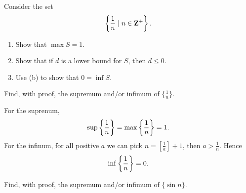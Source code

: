 \begin{exercise}
Consider the set
\[\left\{\frac{1}{n}\mid n\in\mathbf Z^{+}\right\}.\]
\begin{enumerate}[label=(\alph*)]
\item Show that $\max S=1$.
\item Show that if $d$ is a lower bound for $S$, then $d \le 0$.
\item Use (b) to show that $0 = \inf S$.
\end{enumerate}
\end{exercise}

\begin{exercise}
Find, with proof, the supremum and/or infimum of $\{\frac{1}{n}\}$.
\end{exercise}

\begin{solution}
For the suprenum,
\[ \sup\left\{\frac{1}{n}\right\} = \max\left\{\frac{1}{n}\right\} = 1. \]
For the infinum, for all positive $a$ we can pick $n=[\frac{1}{a}]+1$, then $a>\frac{1}{n}$. Hence 
\[ \inf\left\{\frac{1}{n}\right\}=0. \]
\end{solution}

\begin{exercise}
Find, with proof, the supremum and/or infimum of $\{\sin n\}$.
\end{exercise}

